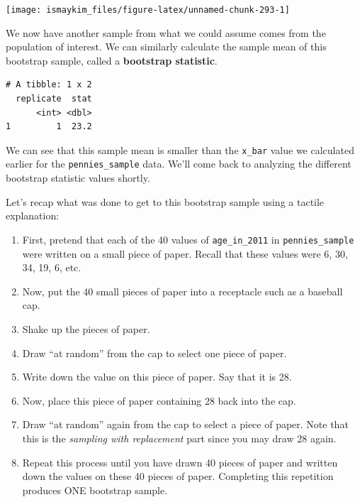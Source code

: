 \documentclass[12pt,]{krantz}
\makeatletter
\newenvironment{Shaded}{\begin{snugshade}}{\end{snugshade}}
\newcommand{\KeywordTok}[1]{\textcolor[rgb]{0.27,0.27,0.27}{\textbf{#1}}}
\newcommand{\DataTypeTok}[1]{\textcolor[rgb]{0.27,0.27,0.27}{#1}}
\newcommand{\DecValTok}[1]{\textcolor[rgb]{0.06,0.06,0.06}{#1}}
\newcommand{\StringTok}[1]{\textcolor[rgb]{0.5,0.5,0.5}{#1}}
\newcommand{\OperatorTok}[1]{\textcolor[rgb]{0.43,0.43,0.43}{\textbf{#1}}}
\newcommand{\NormalTok}[1]{#1}
\providecommand{\tightlist}{%
  \setlength{\itemsep}{0pt}\setlength{\parskip}{0pt}}
\newenvironment{kframe}{%
\medskip{}
\setlength{\fboxsep}{.8em}
 \def\at@end@of@kframe{}%
 \ifinner\ifhmode%
  \def\at@end@of@kframe{\end{minipage}}%
  \begin{minipage}{\columnwidth}%
 \fi\fi%
 \def\FrameCommand##1{\hskip\@totalleftmargin \hskip-\fboxsep
 \colorbox{shadecolor}{##1}\hskip-\fboxsep
     \hskip-\linewidth \hskip-\@totalleftmargin \hskip\columnwidth}%
 \MakeFramed {\advance\hsize-\width
   \@totalleftmargin\z@ \linewidth\hsize
   \@setminipage}}%
 {\par\unskip\endMakeFramed%
 \at@end@of@kframe}
\renewenvironment{Shaded}{\begin{kframe}}{\end{kframe}}
\theoremstyle{definition}
\theoremstyle{definition}
\theoremstyle{definition}
\theoremstyle{remark}
\makeatother
\begin{document}
\begin{center}\texttt{[image: ismaykim\_files/figure-latex/unnamed-chunk-293-1]} \end{center}

We now have another sample from what we could assume comes from the
population of interest. We can similarly calculate the sample mean of
this bootstrap sample, called a \textbf{bootstrap statistic}.

\begin{Shaded}
\end{Shaded}

\begin{verbatim}
# A tibble: 1 x 2
  replicate  stat
      <int> <dbl>
1         1  23.2
\end{verbatim}

We can see that this sample mean is smaller than the \texttt{x\_bar}
value we calculated earlier for the \texttt{pennies\_sample} data. We'll
come back to analyzing the different bootstrap statistic values shortly.

Let's recap what was done to get to this bootstrap sample using a
tactile explanation:

\begin{enumerate}
\def\labelenumi{\arabic{enumi}.}
\tightlist
\item
  First, pretend that each of the 40 values of \texttt{age\_in\_2011} in
  \texttt{pennies\_sample} were written on a small piece of paper.
  Recall that these values were 6, 30, 34, 19, 6, etc.
\item
  Now, put the 40 small pieces of paper into a receptacle such as a
  baseball cap.
\item
  Shake up the pieces of paper.
\item
  Draw ``at random'' from the cap to select one piece of paper.
\item
  Write down the value on this piece of paper. Say that it is 28.
\item
  Now, place this piece of paper containing 28 back into the cap.
\item
  Draw ``at random'' again from the cap to select a piece of paper. Note
  that this is the \emph{sampling with replacement} part since you may
  draw 28 again.
\item
  Repeat this process until you have drawn 40 pieces of paper and
  written down the values on these 40 pieces of paper. Completing this
  repetition produces ONE bootstrap sample.
\end{enumerate}
\end{document}
